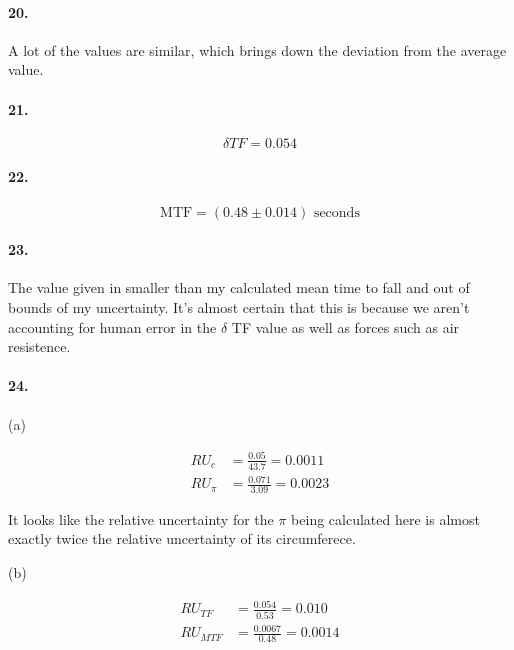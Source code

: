     \paragraph*{20.}
    A lot of the values are similar, which brings down the deviation from the average value.

    \paragraph*{21.}
    \begin{equation*}
        \delta TF = \boxed{0.054}
    \end{equation*}

    \paragraph*{22.}
    \begin{equation*}
        \text{MTF} = \boxed{(0.48 \pm 0.014) \text{ seconds}}
    \end{equation*}

    \paragraph*{23.}
    The value given in smaller than my calculated mean time to fall and out of bounds of my uncertainty. It's almost certain that this is because we aren't accounting for human error in the $\delta$ TF value as well as forces such as air resistence.

    \paragraph*{24.} 
    
    (a)

    \begin{align*}
        RU_c         & = \frac{0.05}{43.7}  = 0.0011    \\
        RU_{\pi}     & = \frac{0.071}{3.09} = 0.0023
    \end{align*}

    It looks like the relative uncertainty for the $\pi$ being calculated here is almost exactly twice the relative uncertainty of its circumferece.

    (b)

    \begin{align*}
        RU_{TF}     & = \frac{0.054}{0.53}  = 0.010    \\
        RU_{MTF}     & = \frac{0.0067}{0.48} = 0.0014
    \end{align*}


